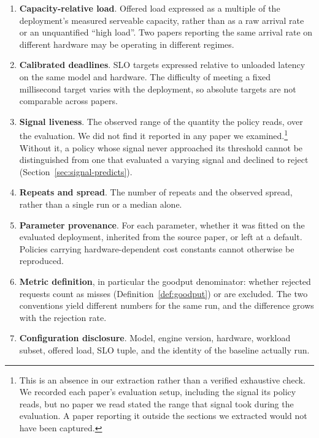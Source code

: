 \documentclass[10pt]{article} %
\theoremstyle{definition}
\begin{document}
\begin{enumerate}[leftmargin=1.5em, itemsep=2pt]
\item \textbf{Capacity-relative load}. Offered load expressed as a
      multiple of the deployment's measured serveable capacity, rather
      than as a raw arrival rate or an unquantified ``high load''. Two
      papers reporting the same arrival rate on different hardware may
      be operating in different regimes.
\item \textbf{Calibrated deadlines}. SLO targets expressed relative to
      unloaded latency on the same model and hardware. The difficulty
      of meeting a fixed millisecond target varies with the deployment,
      so absolute targets are not comparable across papers.
\item \textbf{Signal liveness}. The observed range of the quantity the
      policy reads, over the evaluation. We did not find it reported
      in any paper we examined.\footnote{This is an absence in our
      extraction rather than a verified exhaustive check. We recorded
      each paper's evaluation setup, including the signal its policy
      reads, but no paper we read stated the range that signal took
      during the evaluation. A paper reporting it outside the sections
      we extracted would not have been captured.} Without it, a policy whose signal never approached its
      threshold cannot be distinguished from one that evaluated a
      varying signal and declined to reject
      (Section~\ref{sec:signal-predicts}).
\item \textbf{Repeats and spread}. The number of repeats and the
      observed spread, rather than a single run or a median alone.
\item \textbf{Parameter provenance}. For each parameter, whether it was
      fitted on the evaluated deployment, inherited from the source
      paper, or left at a default. Policies carrying hardware-dependent
      cost constants cannot otherwise be reproduced.
\item \textbf{Metric definition}, in particular the goodput
      denominator: whether rejected requests count as misses
      (Definition~\ref{def:goodput}) or are excluded. The two
      conventions yield different numbers for the same run, and the
      difference grows with the rejection rate.
\item \textbf{Configuration disclosure}. Model, engine version,
      hardware, workload subset, offered load, SLO tuple, and the
      identity of the baseline actually run.
\end{enumerate}
\end{document}
